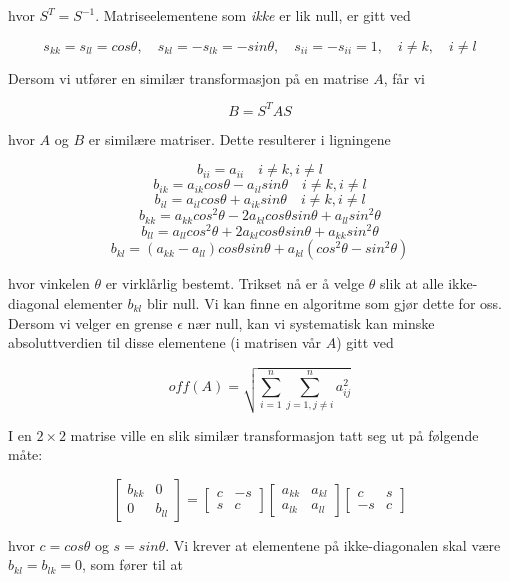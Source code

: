 \documentclass{article}
\begin{document}
hvor $S^T = S^{-1}$. Matriseelementene som \textit{ikke} er lik null, er gitt ved 

\[s_{kk} = s_{ll} = cos \theta, \quad s_{kl} = -s_{lk} = -sin\theta, \quad s_{ii} = -s_{ii} = 1, \quad i \neq k, \quad i \neq l \]

Dersom vi utfører en similær transformasjon på en matrise $A$, får vi 

\[B = S^T A S\]

hvor $A$ og $B$ er similære matriser. Dette resulterer i ligningene

\[b_{ii} = a_{ii} \quad i \neq k, i\neq l  \]
\[b_{ik} = a_{ik} cos\theta - a_{il} sin \theta \quad i \neq k, i \neq l \]
\[b_{il} = a_{il} cos \theta + a_{ik} sin \theta \quad i \neq k, i \neq l \]
\[ b_{kk} = a_{kk} cos^2\theta - 2a_{kl} cos \theta sin \theta + a_{ll} sin^2 \theta \]
\[ b_{ll} = a_ {ll}cos^2\theta + 2a_{kl} cos \theta sin\theta + a_{kk} sin^2 \theta \]
\[ b_{kl} = (a_{kk} - a_{ll} ) cos \theta sin \theta + a_{kl}(cos^2 \theta - sin^2 \theta ) \]

hvor vinkelen $\theta$ er virklårlig bestemt. Trikset nå er å velge $\theta$ slik at alle ikke-diagonal elementer $b_{kl}$ blir null. Vi kan finne en algoritme som gjør dette for oss. Dersom vi velger en grense $\epsilon$ nær null, kan vi systematisk kan minske absoluttverdien til disse elementene (i matrisen vår $A$) gitt ved

\[off(A) = \sqrt{\sum_{i=1}^n \sum_{j=1, j\neq i}^n a_{ij}^2 } \]

I en $2 \times 2$ matrise ville en slik similær transformasjon tatt seg ut på følgende måte: 

\[\begin{bmatrix} 
b_{kk} &0 \\ 
0& b_{ll} \end{bmatrix} =
 \begin{bmatrix} 
 c & -s\\ 
 s & c \end{bmatrix}
 \begin{bmatrix} 
 a_{kk} & a_{kl}\\
  a_{lk}& a_{ll} \end{bmatrix}
  \begin{bmatrix} 
  c & s\\ 
  -s &c \end{bmatrix}\]

hvor $c = cos\theta$ og $s = sin\theta$. Vi krever at elementene på ikke-diagonalen skal være $b_{kl} = b_{lk} = 0$, som fører til at
\end{document}
